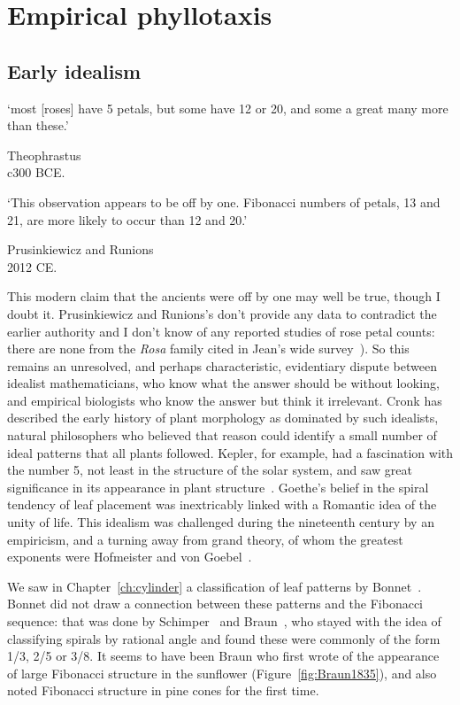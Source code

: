 
    
  \chapter{Empirical phyllotaxis}
  \label{ch:empirical}
  \section{Early idealism}
  \epigraph{`most [roses] have 5 petals, but some
  	have 12 or 20, and some a great many more than these.'}{Theophrastus ~\autocite{theophrastusEnquiryPlantsBook1916}\\
  	c300 BCE.}
 \epigraph{
  	`This observation appears to be off by one. Fibonacci
  	numbers of petals, 13 and 21, are more likely to occur than 12	and 20.' 
  }{  	Prusinkiewicz and Runions \autocite{prusinkiewiczComputationalModelsPlant2012}
  	\\2012 CE.}
  This modern claim that the ancients were off by one may well be true, though I doubt it.  Prusinkiewicz and Runions's don't provide any data to contradict the earlier authority and I don't know of any reported studies of rose petal counts: there are none from the \emph{Rosa} family cited in Jean's wide survey~\cite{jeanPhyllotaxisSystemicStudy1994}). So this remains an unresolved, and perhaps characteristic, evidentiary dispute between idealist mathematicians, who know what the answer should be without looking, and empirical biologists who know the answer but think it irrelevant. 
  Cronk has described the early history of plant morphology as dominated by such idealists, natural philosophers who believed that reason could identify a small number of ideal patterns that all plants followed. Kepler, for example, had a fascination with the number 5, not least in the structure of the solar system,  and saw great significance in its appearance in plant structure~\cite{keplerSixCorneredSnowflake16112014}. Goethe's belief in the spiral tendency of leaf placement was inextricably linked with a Romantic idea of the unity of life. This idealism was challenged during the nineteenth century by an empiricism, and a turning away from grand theory,  of whom the greatest exponents were Hofmeister and von Goebel~\autocite{cronkMolecularOrganographyPlants2009}.
  
  
  We saw in Chapter~\ref{ch:cylinder} a classification of leaf patterns by Bonnet~\autocite{bonnetRecherchesUsageFeuilles1754}. Bonnet did not draw a connection between these patterns and the Fibonacci sequence: that was done by Schimper~\cite{schimperBeschreibungSymphytumZeyheri1835} and Braun~\cites{braunDrCarlSchimper1835, braunVergleichendeUntersuchungUber1831}, who stayed with the idea of classifying spirals by rational angle and found these were commonly of the form 1/3, 2/5 or 3/8. It seems to have been Braun who first wrote of the appearance of large Fibonacci structure in the sunflower (Figure~\ref{fig:Braun1835}), and also noted Fibonacci structure in pine cones for the first time. 
  
